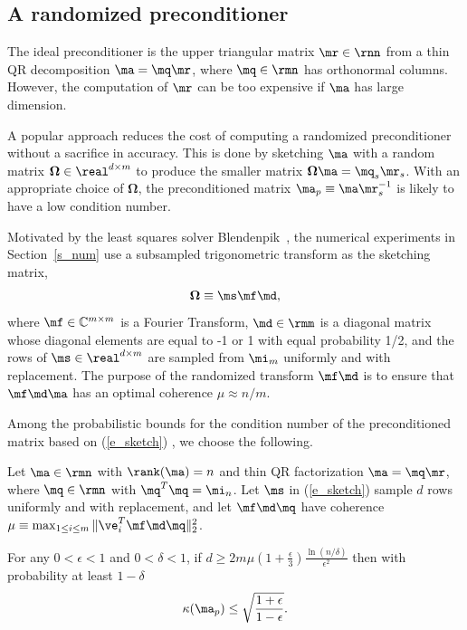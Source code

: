 \documentclass[final]{siamart220329}%
\begin{document}
\subsection{A randomized preconditioner}\label{rp}
The ideal preconditioner is the upper triangular matrix 
$\mr\in\rnn$ from a thin QR decomposition $\ma=\mq\mr$, where
$\mq\in\rmn$ has orthonormal columns. However, the computation of $\mr$ can be too expensive if $\ma$ has large dimension. 

A popular approach \cite{Blendenpik,carson2025,epperly2025fastrandomizedleastsquaressolvers,garrisonipsen} reduces the cost of computing a randomized preconditioner without a sacrifice in accuracy. 
This is done by sketching $\ma$ with a random matrix $\mathbf{\Omega}\in\real^{d\times m}$ 
to produce the smaller matrix $\mathbf{\Omega}\ma=\mq_s\mr_s$.
With an appropriate choice of $\mathbf{\Omega}$, 
the preconditioned matrix $\ma_p\equiv\ma\mr_s^{-1}$ is likely 
to have a low condition number.

Motivated by the least squares solver Blendenpik~\cite{Blendenpik},
the numerical experiments in Section~\ref{s_num} 
use a subsampled trigonometric transform as the sketching matrix,
\begin{align}\label{e_sketch}
    \mathbf{\Omega}\equiv\ms\mf\md,
\end{align}
where $\mf\in\mathbb{C}^{m\times m}$ is a Fourier Transform, 
$\md\in\rmm$ is a diagonal matrix whose diagonal elements 
are equal to -1 or 1 with equal probability 1/2, and the rows
of  $\ms\in\real^{d\times m}$ are sampled from $\mi_m$ uniformly and with replacement. 
The purpose of the randomized transform $\mf\md$ is to 
ensure that $\mf\md\ma$ has an optimal coherence $\mu\approx n/m$. 

Among the probabilistic bounds for the condition number of the preconditioned matrix based on (\ref{e_sketch}) \cite{Blendenpik,ipsen2025solutionsquaresproblemsrandomized,IpsW12,RT08}, we choose the following.

\begin{lemma}
Let $\ma\in\rmn$ with $\rank(\ma)=n$ and thin QR factorization $\ma=\mq\mr$, where $\mq\in\rmn$ with $\mq^T\mq=\mi_n$. Let $\ms$ in (\ref{e_sketch}) sample $d$ rows uniformly
and with replacement, and let $\mf\md\mq$ have coherence
$\mu\equiv \max_{1\leq i\leq m}{\|\ve_i^T\mf\md\mq\|_2^2}$.

For any $0<\epsilon<1$ and $0<\delta<1$, if $d\geq 2m\mu (1+\tfrac{\epsilon}{3})\tfrac{\ln(n/\delta)}{\epsilon^2}$
then with probability at least $1-\delta$
\begin{equation}\label{e_condAp} 
\kappa(\ma_p)\leq \sqrt{\frac{1+\epsilon}{1-\epsilon}}.
\end{equation}
\end{lemma}
\end{document}
